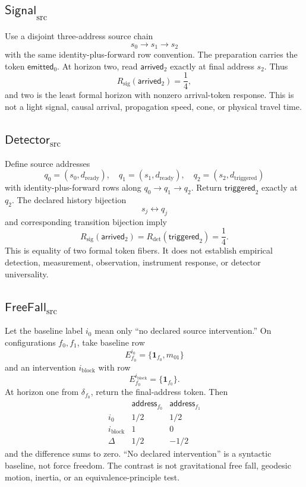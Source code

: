 \documentclass[11pt]{article}
\begin{document}
\subsection{\(\mathsf{Signal}_{\mathrm{src}}\)}

Use a disjoint three-address source chain
\[
  s_0\longrightarrow s_1\longrightarrow s_2
\]
with the same identity-plus-forward row convention. The preparation carries
the token \(\mathsf{emitted}_0\). At horizon two, read
\(\mathsf{arrived}_2\) exactly at final address \(s_2\). Thus
\[
  R_{\mathrm{sig}}(\mathsf{arrived}_2)=\frac14,
\]
and two is the least formal horizon with nonzero arrival-token response.
This is not a light signal, causal arrival, propagation speed, cone, or
physical travel time.

\subsection{\(\mathsf{Detector}_{\mathrm{src}}\)}

Define source addresses
\[
  q_0=(s_0,d_{\mathrm{ready}}),\quad
  q_1=(s_1,d_{\mathrm{ready}}),\quad
  q_2=(s_2,d_{\mathrm{triggered}})
\]
with identity-plus-forward rows along \(q_0\to q_1\to q_2\). Return
\(\mathsf{triggered}_2\) exactly at \(q_2\). The declared history bijection
\[
  s_j\longleftrightarrow q_j
\]
and corresponding transition bijection imply
\[
  R_{\mathrm{sig}}(\mathsf{arrived}_2)
  =
  R_{\mathrm{det}}(\mathsf{triggered}_2)
  =
  \frac14.
\]
This is equality of two formal token fibers. It does not establish empirical
detection, measurement, observation, instrument response, or detector
universality.

\subsection{\(\mathsf{FreeFall}_{\mathrm{src}}\)}

Let the baseline label \(i_0\) mean only ``no declared source intervention.''
On configurations \(f_0,f_1\), take baseline row
\[
 E^{i_0}_{f_0}=\{\mathbf1_{f_0},m_{01}\}
\]
and an intervention \(i_{\mathrm{block}}\) with row
\[
 E^{i_{\mathrm{block}}}_{f_0}=\{\mathbf1_{f_0}\}.
\]
At horizon one from \(\delta_{f_0}\), return the final-address token. Then
\[
\begin{array}{c|cc}
 &\mathsf{address}_{f_0}&\mathsf{address}_{f_1}\\
\hline
i_0&1/2&1/2\\
i_{\mathrm{block}}&1&0\\
\Delta&1/2&-1/2
\end{array}
\]
and the difference sums to zero. ``No declared intervention'' is a syntactic
baseline, not force freedom. The contrast is not gravitational free fall,
geodesic motion, inertia, or an equivalence-principle test.
\end{document}
